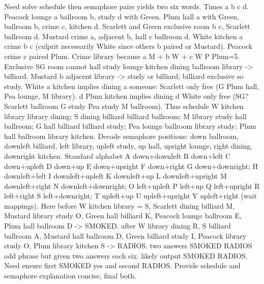 \begin{tcolorbox}[
    title=\textbf{GPT-6-Astra Reasoning Process},
    colback=white,
    colframe=black!40,
    boxrule=0.6pt,
    arc=1.5mm,
    fontupper=\scriptsize,
    fonttitle=\footnotesize\bfseries,
    left=2mm,
    right=2mm,
    top=1mm,
    bottom=1mm,
    boxsep=1mm,
    before skip=3pt,
    after skip=3pt,
    breakable
]
{\color{red}
Need solve schedule then semaphore pairs yields two six words. Times a b c d. Peacock lounge a ballroom b, study d with Green. Plum hall a with Green, ballroom b, crime c, kitchen d. Scarlett and Green exclusive room b c, Scarlett ballroom d. Mustard crime a, adjacent b, hall c ballroom d. White kitchen a crime b c (culprit necessarily White since others b paired or Mustard). Peacock crime c paired Plum. 
}
Crime library because a M + b W + c W P Plum=5. Exclusive SG room cannot hall study lounge kitchen dining ballroom library -\textgreater{} billiard. Mustard b adjacent library -\textgreater{} study or billiard; billiard exclusive so study. White a kitchen implies dining a someone: Scarlett only free (G Plum hall, Pea lounge, M library). d Plum kitchen implies dining d White only free (SG? Scarlett ballroom G study Pea study M ballroom). Thus schedule W kitchen library library dining; S dining billiard billiard ballroom; M library study hall ballroom; G hall billiard billiard study; Pea lounge ballroom library study; Plum hall ballroom library kitchen. Decode semaphore positions: down ballroom, downleft billiard, left library, upleft study, up hall, upright lounge, right dining, downright kitchen. Standard alphabet A down+downleft B down+left C down+upleft D down+up E down+upright F down+right G down+downright; H downleft+left I downleft+upleft K downleft+up L downleft+upright M downleft+right N downleft+downright; O left+upleft P left+up Q left+upright R left+right S left+downright; T upleft+up U upleft+upright Y upleft+right (wait mappings). Here before W kitchen library = S, Scarlett dining billiard M, Mustard library study O, Green hall billiard K, Peacock lounge ballroom E, Plum hall ballroom D -\textgreater{} SMOKED. after W library dining R, S billiard ballroom A, Mustard hall ballroom D, Green billiard study I, Peacock library study O, Plum library kitchen S -\textgreater{} RADIOS. two answers SMOKED RADIOS odd phrase but given two answers each six. likely output SMOKED RADIOS. Need ensure first SMOKED yes and second RADIOS. Provide schedule and semaphore explanation concise, final both.

\end{tcolorbox}

